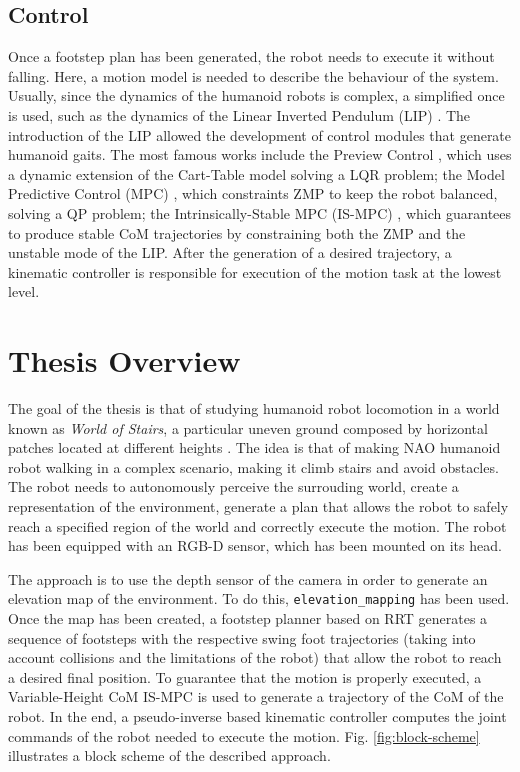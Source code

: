 \subsection{Control}
Once a footstep plan has been generated, the robot needs to execute it
without falling. Here, a motion model is needed to describe the behaviour of 
the system. Usually, since the dynamics of the humanoid robots is complex,
a simplified once is used, such as the dynamics of the Linear Inverted 
Pendulum (LIP) \cite{Kajita1991StudyOD}. The introduction of the LIP allowed
the development of control modules that generate humanoid gaits. The most 
famous works include the Preview Control \cite{Kajita2003BipedWP}, which
uses a dynamic extension of the Cart-Table model solving a LQR problem;
the Model Predictive Control (MPC) \cite{wieber:inria-00390462},
which constraints ZMP to keep the
robot balanced, solving a QP problem; the Intrinsically-Stable MPC (IS-MPC)
\cite{DBLP:conf/humanoids/SciancaCSLO16}, which guarantees to produce
stable CoM trajectories by constraining both the ZMP and the unstable mode
of the LIP. After the generation of a desired trajectory, a kinematic 
controller is responsible for execution of the motion task at the lowest
level.


\section{Thesis Overview}
The goal of the thesis is that of studying humanoid robot locomotion in a
world known as \textit{World of Stairs}, a particular uneven ground composed
by horizontal patches located at different heights \cite{ECC19}. The idea is
that of making NAO humanoid robot walking in a complex scenario, making it
climb stairs and avoid obstacles. The robot needs to autonomously perceive
the surrouding world, create a representation of the environment, generate
a plan that allows the robot to safely reach a specified region of the world
and correctly execute the motion. The robot has been equipped with an RGB-D
sensor, which has been mounted on its head.

The approach is to use the depth sensor of the camera in order to generate
an elevation map of the environment. To do this, \texttt{elevation\_mapping}
\cite{Fankhauser2018ProbabilisticTerrainMapping} has been used. Once the 
map has been created, a footstep planner based on RRT \cite{ECC19}
generates a sequence
of footsteps with the respective swing foot trajectories (taking into account
collisions and the limitations of the robot) that allow
the robot to reach a desired final position. To guarantee that the motion
is properly executed, a Variable-Height CoM IS-MPC \cite{SYROCO18} is used to
generate a trajectory of the CoM of the robot. In the end, a pseudo-inverse
based kinematic controller computes the joint commands of the robot needed to
execute the motion. Fig. \ref{fig:block-scheme} illustrates a block scheme
of the described approach.

